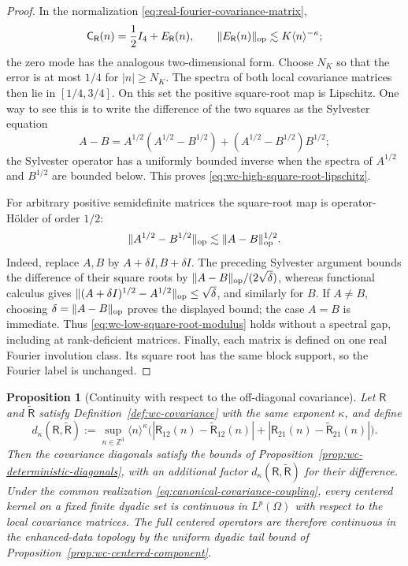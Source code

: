 \documentclass[10pt]{amsart}
\numberwithin{equation}{section}
\theoremstyle{plain}
\newtheorem{proposition}[theorem]{Proposition}
\theoremstyle{definition}
\theoremstyle{remark}
\begin{document}
\begin{proof}
In the normalization \eqref{eq:real-fourier-covariance-matrix},
\[
        \mathsf C_{\mathsf R}(n)=\frac12 I_4+E_{\mathsf R}(n),
        \qquad
        \|E_{\mathsf R}(n)\|_{\rm op}
        \lesssim K\langle n\rangle^{-\kappa};
\]
the zero mode has the analogous two-dimensional form.  Choose $N_K$ so that
the error is at most $1/4$ for $|n|\ge N_K$.  The spectra of both local
covariance matrices then lie in $[1/4,3/4]$.  On this set the positive square-root
map is Lipschitz.  One way to see this is to write the difference of the two
squares as the Sylvester equation
\[
 A-B=A^{1/2}(A^{1/2}-B^{1/2})
       +(A^{1/2}-B^{1/2})B^{1/2};
\]
the Sylvester operator has a uniformly bounded inverse when the spectra of
$A^{1/2}$ and $B^{1/2}$ are bounded below.  This proves
\eqref{eq:wc-high-square-root-lipschitz}.

For arbitrary positive semidefinite matrices the square-root map is
operator-H\"older of order $1/2$:
\[
        \|A^{1/2}-B^{1/2}\|_{\rm op}
        \lesssim \|A-B\|_{\rm op}^{1/2}.
\]
Indeed, replace $A,B$ by $A+\delta I,B+\delta I$.  The preceding Sylvester
argument bounds the difference of their square roots by
$\|A-B\|_{\rm op}/(2\sqrt\delta)$, whereas functional calculus gives
$\|(A+\delta I)^{1/2}-A^{1/2}\|_{\rm op}\le\sqrt\delta$, and similarly for
$B$.  If $A\ne B$, choosing $\delta=\|A-B\|_{\rm op}$ proves the displayed
bound; the case $A=B$ is immediate.  Thus
\eqref{eq:wc-low-square-root-modulus} holds without a spectral gap, including at
rank-deficient matrices.  Finally, each matrix is defined on one
real Fourier involution class.  Its square root has the same block support, so
the Fourier label is unchanged.
\end{proof}


\begin{proposition}[Continuity with respect to the off-diagonal covariance]\label{prop:wc-covariance-continuity}
Let \(\mathsf R\) and \(\widetilde{\mathsf R}\) satisfy Definition~\ref{def:wc-covariance} with the same exponent \(\kappa\), and define
\begin{equation}\label{eq:wc-covariance-distance}
        d_{\kappa}(\mathsf R,\widetilde{\mathsf R})
        :=\sup_{n\in\mathbb Z^3}\langle n\rangle^\kappa
        \bigl(|\mathsf R_{12}(n)-\widetilde{\mathsf R}_{12}(n)|
        +|\mathsf R_{21}(n)-\widetilde{\mathsf R}_{21}(n)|\bigr).
\end{equation}
Then the covariance diagonals satisfy the bounds of Proposition~\ref{prop:wc-deterministic-diagonals}, with an additional factor \(d_\kappa(\mathsf R,\widetilde{\mathsf R})\) for their difference.  Under the common realization \eqref{eq:canonical-covariance-coupling}, every centered kernel on a fixed finite dyadic set is continuous in $L^p(\Omega)$ with respect to the local covariance matrices.  The full centered operators are therefore continuous in the enhanced-data topology by the uniform dyadic tail bound of Proposition~\ref{prop:wc-centered-component}.
\end{proposition}
\end{document}
